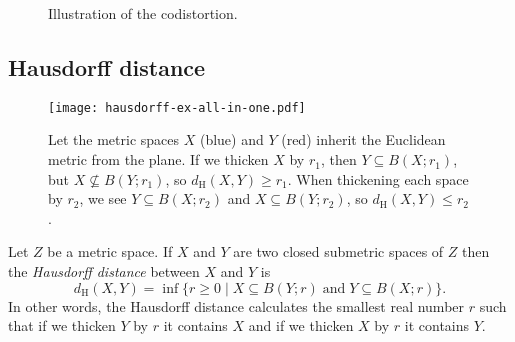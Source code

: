\documentclass[11pt, reqno, english]{amsart}
\begin{document}
\begin{figure}[h]
\centering
{}
\caption{Illustration of the codistortion.}
\label{fig:codistortion}
\end{figure}


\subsection*{Hausdorff distance}

\begin{figure}
    \centering
    \texttt{[image: hausdorff-ex-all-in-one.pdf]}
    \caption{Let the metric spaces $X$ (blue) and $Y$ (red) inherit the Euclidean metric from the plane.
    If we thicken $X$ by $r_1$, then $Y\subseteq B(X;r_1)$, but $X\not\subseteq B(Y;r_1)$, so $d_\mathrm{H}(X,Y)\ge r_1$.
    When thickening each space by  $r_2$, we see $Y\subseteq B(X;r_2)$ and $X\subseteq B(Y;r_2)$, so $d_\mathrm{H}(X,Y)\le r_2$.}
    \label{fig:hausdorff}
\end{figure}

Let $Z$ be a metric space.
If $X$ and $Y$ are two closed submetric spaces of $Z$ then the \emph{Hausdorff distance} between $X$ and $Y$ is
\[d_\mathrm{H}(X,Y)=\inf\{r\geq 0\mid X\subseteq B(Y;r)\;\mbox{and}\; Y\subseteq B(X;r)\}.\]
In other words, the Hausdorff distance calculates the smallest real number $r$ such that if we thicken $Y$ by $r$ it contains $X$ and if we thicken $X$ by $r$ it contains $Y$.
\end{document}
